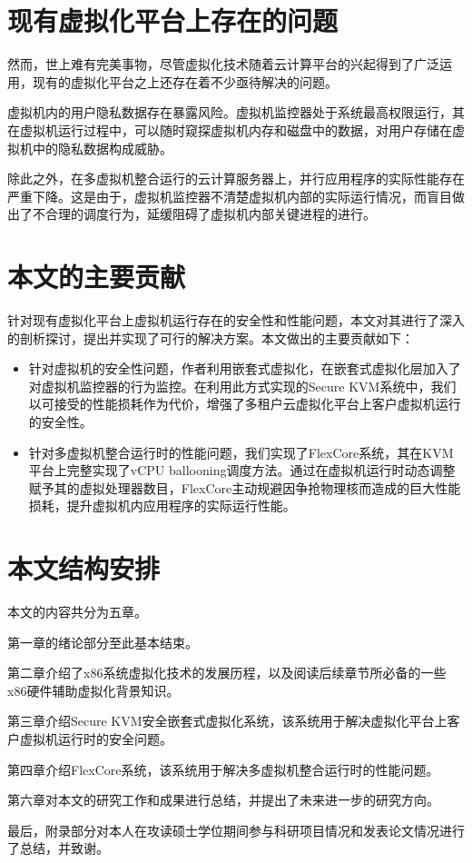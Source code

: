 \section{现有虚拟化平台上存在的问题}

然而，世上难有完美事物，尽管虚拟化技术随着云计算平台的兴起得到了广泛运用，现有的虚拟化平台之上还存在着不少亟待解决的问题。

虚拟机内的用户隐私数据存在暴露风险。虚拟机监控器处于系统最高权限运行，其在虚拟机运行过程中，可以随时窥探虚拟机内存和磁盘中的数据，对用户存储在虚拟机中的隐私数据构成威胁。

除此之外，在多虚拟机整合运行的云计算服务器上，并行应用程序的实际性能存在严重下降。这是由于，虚拟机监控器不清楚虚拟机内部的实际运行情况，而盲目做出了不合理的调度行为，延缓阻碍了虚拟机内部关键进程的进行。

\section{本文的主要贡献}

针对现有虚拟化平台上虚拟机运行存在的安全性和性能问题，本文对其进行了深入的剖析探讨，提出并实现了可行的解决方案。本文做出的主要贡献如下：

\begin{itemize}
\item 针对虚拟机的安全性问题，作者利用嵌套式虚拟化，在嵌套式虚拟化层加入了对虚拟机监控器的行为监控。在利用此方式实现的Secure KVM系统中，我们以可接受的性能损耗作为代价，增强了多租户云虚拟化平台上客户虚拟机运行的安全性。
\item 针对多虚拟机整合运行时的性能问题，我们实现了FlexCore系统，其在KVM平台上完整实现了vCPU ballooning调度方法。通过在虚拟机运行时动态调整赋予其的虚拟处理器数目，FlexCore主动规避因争抢物理核而造成的巨大性能损耗，提升虚拟机内应用程序的实际运行性能。
\end{itemize}

\section{本文结构安排}

本文的内容共分为五章。

第一章的绪论部分至此基本结束。

第二章介绍了x86系统虚拟化技术的发展历程，以及阅读后续章节所必备的一些x86硬件辅助虚拟化背景知识。

第三章介绍Secure KVM安全嵌套式虚拟化系统，该系统用于解决虚拟化平台上客户虚拟机运行时的安全问题。

第四章介绍FlexCore系统，该系统用于解决多虚拟机整合运行时的性能问题。

第六章对本文的研究工作和成果进行总结，并提出了未来进一步的研究方向。

最后，附录部分对本人在攻读硕士学位期间参与科研项目情况和发表论文情况进行了总结，并致谢。




